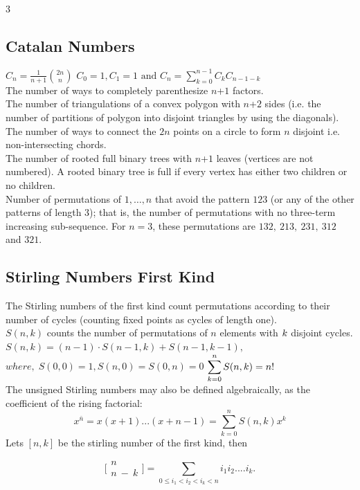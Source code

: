 \begin{multicols*}{3}
\subsection{Catalan Numbers}
$\displaystyle C_n=\frac{1}{n+1}{2n \choose n}$
$\displaystyle C_0=1,C_1=1\text{ and }C_n=\sum \limits_{k=0}^{n-1}C_k C_{n-1-k}$ \\
The number of ways to completely parenthesize $n$+$\displaystyle 1$ factors. \\
The number of triangulations of a convex polygon with $n$+$\displaystyle 2$ sides (i.e. the number of partitions of polygon into disjoint triangles by using the diagonals). \\
The number of ways to connect the $\displaystyle 2n$ points on a circle to form $n$ disjoint i.e. non-intersecting chords. \\
The number of rooted full binary trees with $n$+$\displaystyle 1$ leaves (vertices are not numbered). A rooted binary tree is full if every vertex has either two children or no children. \\
Number of permutations of $\displaystyle {1, …, n}$ that avoid the pattern $\displaystyle 123$ (or any of the other patterns of length $3$); that is, the number of permutations with no three-term increasing sub-sequence. For $n = 3$, these permutations are $\displaystyle 132,\ 213,\ 231,\ 312$ and $321.$

\subsection{Stirling Numbers First Kind}
The Stirling numbers of the first kind count permutations according to their number of cycles (counting fixed points as cycles of length one). \\
$S(n,k)$ counts the number of permutations of $n$ elements with $\displaystyle \displaystyle k$ disjoint cycles. \\
$S(n,k)=(n-1) \cdot S(n-1,k)+S(n-1,k-1),$ \(where,\; S(0,0)=1,S(n,0)=S(0,n)=0\)
$\displaystyle \displaystyle\sum_{k=0}^{n}S(n,k) = n!$ \\
The unsigned Stirling numbers may also be defined algebraically, as the coefficient of the rising factorial:
\[\displaystyle x^{\bar{n}} = x(x+1)...(x+n-1) = \sum_{k=0}^{n}{ S(n, k) x^k}\]
Lets $[n, k]$ be the stirling number of the first kind, then

\[\displaystyle \bigl[\!\begin{smallmatrix} n \\ n\ -\ k \end{smallmatrix}\!\bigr] = \sum_{0 \leq i_1 < i_2 < i_k < n}{i_1i_2....i_k.}\]


\end{multicols*}
